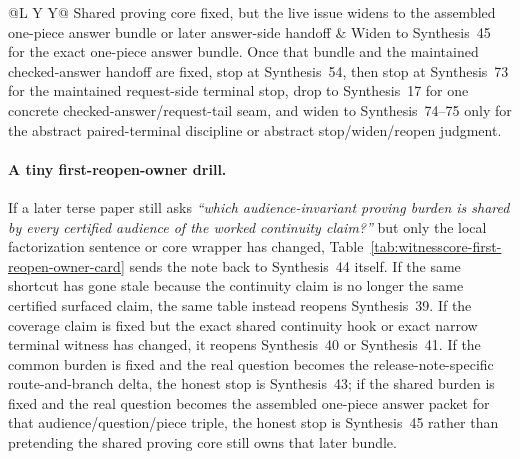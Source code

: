\documentclass[11pt]{article}
\begin{document}
\begin{table}[t]
\begin{tabularx}{\linewidth}{@{}L Y Y@{}}
Shared proving core fixed, but the live issue widens to the assembled one-piece answer bundle or later answer-side handoff & Widen to Synthesis~45 for the exact one-piece answer bundle. Once that bundle and the maintained checked-answer handoff are fixed, stop at Synthesis~54, then stop at Synthesis~73 for the maintained request-side terminal stop, drop to Synthesis~17 for one concrete checked-answer/request-tail seam, and widen to Synthesis~74--75 only for the abstract paired-terminal discipline or abstract stop/widen/reopen judgment. \\
\bottomrule
\end{tabularx}
\caption{A compact shared-core first-reopen-owner card. This is the smallest owner-cutover map later terse papers can quote directly when one maintained witness-core shortcut has gone stale and the remaining task is to recover which narrower or wider owner now regains authority first.}
\label{tab:witnesscore-first-reopen-owner-card}
\end{table}

\paragraph{A tiny first-reopen-owner drill.}
If a later terse paper still asks \emph{``which audience-invariant proving burden is shared by every certified audience of the worked continuity claim?''} but only the local factorization sentence or core wrapper has changed, Table~\ref{tab:witnesscore-first-reopen-owner-card} sends the note back to Synthesis~44 itself. If the same shortcut has gone stale because the continuity claim is no longer the same certified surfaced claim, the same table instead reopens Synthesis~39. If the coverage claim is fixed but the exact shared continuity hook or exact narrow terminal witness has changed, it reopens Synthesis~40 or Synthesis~41. If the common burden is fixed and the real question becomes the release-note-specific route-and-branch delta, the honest stop is Synthesis~43; if the shared burden is fixed and the real question becomes the assembled one-piece answer packet for that audience/question/piece triple, the honest stop is Synthesis~45 rather than pretending the shared proving core still owns that later bundle.\cite{series:workedexample,series:challengeanswerreviewmenus,series:publicrequestresponsepacketrefreshresponsepacketclosureverdicts,series:pairedterminalcitationdiscipline,series:pairedterminalcutoverrules}
\end{document}
